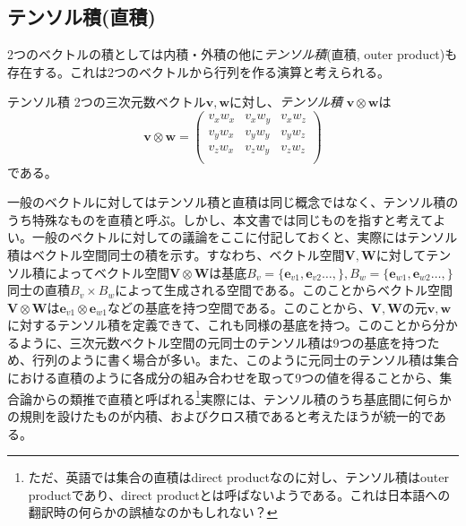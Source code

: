 \subsection{テンソル積(直積)}
2つのベクトルの積としては内積・外積の他に\emph{テンソル積}(直積, outer product)も存在する。これは2つのベクトルから行列を作る演算と考えられる。
\begin{definition*}{テンソル積}
	2つの三次元数ベクトル\(\boldsymbol{v},\boldsymbol{w}\)に対し、\emph{テンソル積} \(\boldsymbol{v} \otimes\boldsymbol{w}\)は
	\begin{equation}
		\boldsymbol{v} \otimes\boldsymbol{w}=
		\begin{pmatrix}
			v_x w_x & v_x w_y & v_x w_z \\
			v_y w_x & v_y w_y & v_y w_z \\
			v_z w_x & v_z w_y & v_z w_z \\
		\end{pmatrix}
	\end{equation}
	である。
\end{definition*}
一般のベクトルに対してはテンソル積と直積は同じ概念ではなく、テンソル積のうち特殊なものを直積と呼ぶ。しかし、本文書では同じものを指すと考えてよい。一般のベクトルに対しての議論をここに付記しておくと、実際にはテンソル積はベクトル空間同士の積を示す。すなわち、ベクトル空間\(\boldsymbol{V},\boldsymbol{W}\)に対してテンソル積によってベクトル空間\(\boldsymbol{V}\otimes \boldsymbol{W}\)は基底\(B_v=\{\boldsymbol{e}_{v1},\boldsymbol{e}_{v2}\dots ,\}, B_w=\{\boldsymbol{e}_{w1},\boldsymbol{e}_{w2}\dots ,\}\)同士の直積\(B_v\times B_w\)によって生成される空間である。このことからベクトル空間\(\boldsymbol{V}\otimes \boldsymbol{W}\)は\(\boldsymbol{e}_{v1}\otimes\boldsymbol{e}_{w1}\)などの基底を持つ空間である。このことから、\(\boldsymbol{V},\boldsymbol{W}\)の元\(\boldsymbol{v},\boldsymbol{w}\)に対するテンソル積を定義できて、これも同様の基底を持つ。このことから分かるように、三次元数ベクトル空間の元同士のテンソル積は9つの基底を持つため、行列のように書く場合が多い。また、このように元同士のテンソル積は集合における直積のように各成分の組み合わせを取って9つの値を得ることから、集合論からの類推で直積と呼ばれる\footnote{ただ、英語では集合の直積はdirect productなのに対し、テンソル積はouter productであり、direct productとは呼ばないようである。これは日本語への翻訳時の何らかの誤植なのかもしれない？}実際には、テンソル積のうち基底間に何らかの規則を設けたものが内積、およびクロス積であると考えたほうが統一的である。
